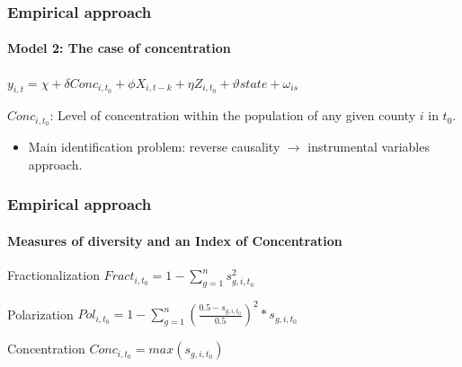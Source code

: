 \documentclass[pdftex,12pt,xcolor=pdftex,table]{beamer}
\begin{document}

\begin{frame}
\frametitle{Empirical approach}
\framesubtitle{Model 2: The case of concentration}

$y_{i,t}=\chi+\delta Conc_{i,t_{0}}+\phi X_{i,t-k}+\eta Z_{i,t_{0}}+\vartheta state+\omega_{is}$

\medskip{}

\small{
$Conc_{i, t_{0}}$: Level of concentration within the population of any given county $i$ in $t_{0}$.
}

\medskip{}

\small{
\begin{itemize}
\item Main identification problem: reverse causality $\rightarrow$ instrumental variables approach.
\end{itemize}
}

\end{frame}



\begin{frame}
\frametitle{Empirical approach}
\framesubtitle{Measures of diversity and an Index of Concentration}

\begin{block}{Fractionalization}
$Fract_{i,t_{0}}=1-\sum_{g=1}^{n}s_{g,i,t_{0}}^{2}$
\end{block}

\begin{block}{Polarization}
$Pol_{i,t_{0}}=1-\sum_{g=1}^{n}\left(\frac{0.5-s_{g,i,t_{0}}}{0.5}\right)^{2}*s_{g,i,t_{0}}$
\end{block}

\begin{block}{Concentration}
$Conc_{i,t_{0}}=max\left(s_{g,i,t_{0}}\right)$
\end{block}

\end{frame}

\end{document}

